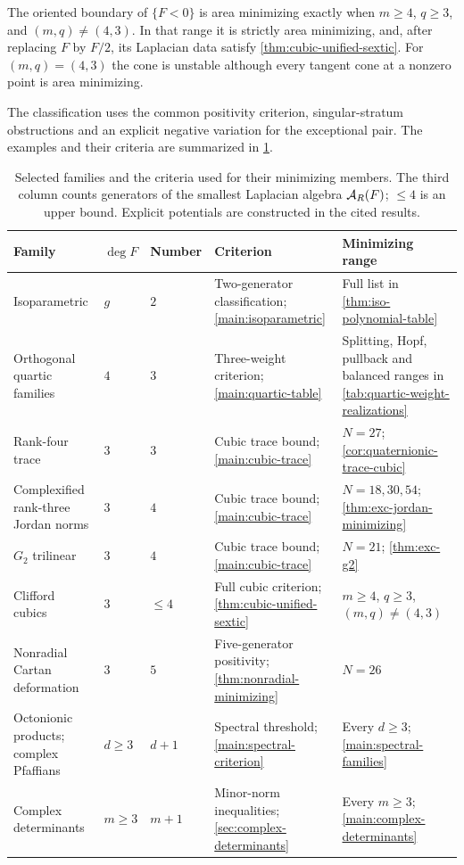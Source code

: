 \begin{maintheorem}
\label{main:clifford-classification}
The oriented boundary of $\{F<0\}$ is area minimizing exactly when
$m\ge4$, $q\ge3$, and $(m,q)\ne(4,3)$. In that range it is
strictly area minimizing, and, after replacing $F$ by $F/2$,
its Laplacian data satisfy \cref{thm:cubic-unified-sextic}.
For $(m,q)=(4,3)$ the cone
is unstable although every tangent cone at a nonzero point is area
minimizing.
\end{maintheorem}
The classification uses the common positivity criterion,
singular-stratum obstructions and an explicit negative variation for
the exceptional pair. The examples and their criteria are summarized
in \cref{tab:intro-family-summary}.

\begin{table}[htbp]
\centering
\small
\setlength{\tabcolsep}{4pt}
\renewcommand{\arraystretch}{1.2}
\caption{Selected families and the criteria used for their minimizing
members. The third column counts generators of the smallest Laplacian
algebra $\mathcal A_R(F)$; $\le4$ is an upper bound. Explicit potentials
are constructed in the cited results.}
\label{tab:intro-family-summary}
\begin{tabular}{@{}>{\raggedright\arraybackslash}p{.24\linewidth}p{.07\linewidth}p{.09\linewidth}>{\raggedright\arraybackslash}p{.25\linewidth}>{\raggedright\arraybackslash}p{.25\linewidth}@{}}
\toprule
Family & $\deg F$ & Number & Criterion & Minimizing range \\
\midrule
Isoparametric & $g$ & $2$ & Two-generator classification; \cref{main:isoparametric}
 & Full list in \cref{thm:iso-polynomial-table} \\
Orthogonal quartic families & $4$ & $3$ & Three-weight criterion; \cref{main:quartic-table}
 & Splitting, Hopf, pullback and balanced ranges in \cref{tab:quartic-weight-realizations} \\
Rank-four trace & $3$ & $3$ & Cubic trace bound; \cref{main:cubic-trace}
 & $N=27$; \cref{cor:quaternionic-trace-cubic} \\
Complexified rank-three Jordan norms & $3$ & $4$ & Cubic trace bound; \cref{main:cubic-trace}
 & $N=18,30,54$; \cref{thm:exc-jordan-minimizing} \\
$G_2$ trilinear & $3$ & $4$ & Cubic trace bound; \cref{main:cubic-trace}
 & $N=21$; \cref{thm:exc-g2} \\
Clifford cubics & $3$ & $\le4$ & Full cubic criterion; \cref{thm:cubic-unified-sextic}
 & $m\ge4$, $q\ge3$, $(m,q)\ne(4,3)$ \\
Nonradial Cartan deformation & $3$ & $5$ & Five-generator positivity; \cref{thm:nonradial-minimizing}
 & $N=26$ \\
Octonionic products; complex Pfaffians & $d\ge3$ & $d+1$ & Spectral threshold; \cref{main:spectral-criterion}
 & Every $d\ge3$; \cref{main:spectral-families} \\
Complex determinants & $m\ge3$ & $m+1$ & Minor-norm inequalities; \cref{sec:complex-determinants}
 & Every $m\ge3$; \cref{main:complex-determinants} \\
\bottomrule
\end{tabular}
\end{table}
\FloatBarrier
